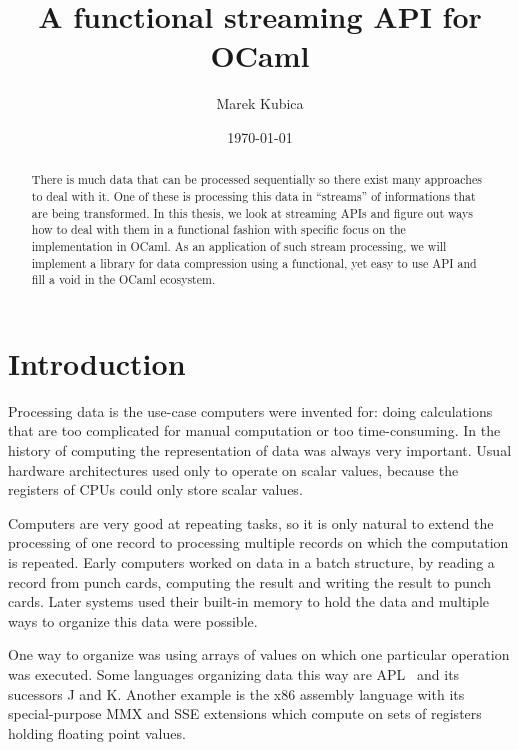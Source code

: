 \documentclass[parskip=half]{scrreprt}
\author{Marek Kubica}
\title{A functional streaming API for OCaml}
\date{\today}
\begin{document}




{}

\begin{abstract}
\subsubsection*{\abstractname}


There is much data that can be processed sequentially so there exist many
approaches to deal with it. One of these is processing this data in
\enquote{streams} of informations that are being transformed. In this thesis,
we look at streaming APIs and figure out ways how to deal with them in a
functional fashion with specific focus on the implementation in OCaml. As an
application of such stream processing, we will implement a library for data
compression using a functional, yet easy to use API and fill a void in the
OCaml ecosystem.

\end{abstract}

\tableofcontents

\chapter{Introduction}
\label{sec:intro}

Processing data is the use-case computers were invented for: doing calculations
that are too complicated for manual computation or too time-consuming.  In the
history of computing the representation of data was always very important.
Usual hardware architectures used only to operate on scalar values, because the
registers of CPUs could only store scalar values.

Computers are very good at repeating tasks, so it is only natural to extend the
processing of one record to processing multiple records on which the
computation is repeated. Early computers worked on data in a batch structure,
by reading a record from punch cards, computing the result and writing the
result to punch cards. Later systems used their built-in memory to hold the
data and multiple ways to organize this data were possible.

One way to organize was using arrays of values on which one particular
operation was executed. Some languages organizing data this way are
APL~\cite[p.~53]{biancuzzi2009masterminds} and its sucessors J and K.  Another
example is the x86 assembly language with its special-purpose MMX and SSE
extensions which compute on sets of registers holding floating point values.
\end{document}
